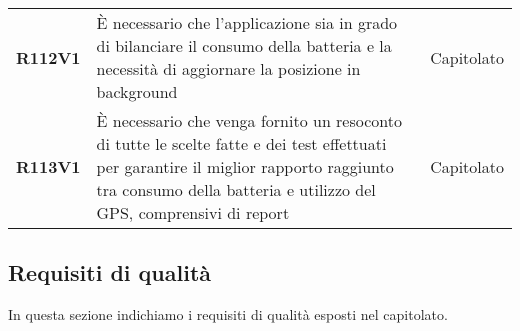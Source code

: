 \documentclass[../analisi-dei-requisiti.tex]{subfiles}
\begin{document}
\begin{longtable}[H]{>{\centering\bfseries}m{3cm} >{\centering}m{10cm} >{\centering\arraybackslash}m{3cm}}
  R112V1                               & È necessario che l'applicazione sia in grado di bilanciare il consumo della batteria e la necessità di aggiornare la posizione in background                                                                                                           & Capitolato                    \\
  R113V1                               & È necessario che venga fornito un resoconto di tutte le scelte fatte e dei test effettuati per garantire il miglior rapporto raggiunto tra consumo della batteria e utilizzo del GPS, comprensivi di report                                            & Capitolato                    \\
\end{longtable}

\newpage
\subsection{Requisiti di qualità}%
\label{sub:requisiti_di_qualita}
In questa sezione indichiamo i requisiti di qualità esposti nel capitolato.
\end{document}
